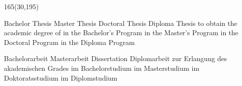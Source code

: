 \begin{textblock}{165}(30,195)
    \begin{minipage}[t]{120mm}
        \Large
        \ifeng
        \ifcase\type
            \ifdefined\subtitle
                \LARGE
                \subtitle
            \else
                \relax
            \fi
        \or Bachelor Thesis
        \or Master Thesis
        \or Doctoral Thesis
        \or Diploma Thesis
        \fi
        \vskip1mm
        \ifcase\type
            \relax
            \else
            {
                \normalsize to obtain the academic degree of
            }
            \vskip2mm
        \fi
        \ifcase\type
        \relax
        \else
        \acadDegree
        \vskip1mm
        \fi
        {
            \normalsize
            \ifcase\type
                \relax
            \or in the Bachelor's Program
            \or in the Master's Program
            \or in the Doctoral Program
            \or in the Diploma Program
            \fi
        }
        \vskip2mm
        \ifcase\type
            \relax
        \else
            \study
        \fi
        \else
        \ifcase\type
            \ifdefined\subtitle
                \LARGE\subtitle
            \else
                \relax
            \fi
        \or Bachelorarbeit
        \or Masterarbeit
        \or Dissertation
        \or Diplomarbeit%
        \fi
        \vskip1mm
        \ifcase\type%
            \relax
            \else
            {
                \normalsize zur Erlangung des akademischen Grades
            }
            \vskip2mm
        \fi
        \ifcase\type%
            \relax
        \else
            \acadDegree \vskip1mm%
            \fi
            {
                \normalsize
                \ifcase\type%
                    \relax
                \or im Bachelorstudium%
                \or im Masterstudium%
                \or im Doktoratsstudium%
                \or im Diplomstudium%
                \fi
            } \vskip2mm
            \ifcase\type%
                \relax
            \else
                \study%
            \fi
        \fi
    \end{minipage}
\end{textblock}
